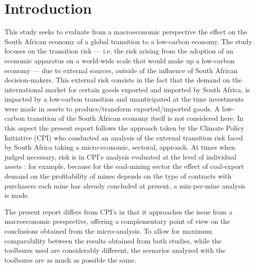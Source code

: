 \documentclass[12pt,english]{article}
\begin{document}
\tableofcontents

\section{Introduction}



This study seeks to evaluate from a macroeconomic perspective the effect on the South African economy of a global transition to a low-carbon economy. The study focuses on the transition risk --- i.e. the risk arising from the adoption of an economic apparatus on a world-wide scale that would make up a low-carbon economy --- due to external sources, outside of the influence of South African decision-makers. This external risk consists in the fact that the demand on the international market for certain goods exported and imported by South Africa, %
is impacted by a low-carbon transition and unanticipated at the time investments were made in assets to produce/transform exported/imported goods. 
A low-carbon transition of the South African economy itself is not considered here. In this aspect the present report follows the approach taken by the Climate Policy Initiative (CPI) who conducted an analysis of the external transition risk faced by South Africa taking a micro-economic, sectoral, approach. At times when judged necessary, risk is in CPI's analysis evaluated at the level of individual assets : for example, because for the coal-mining sector the effect of coal-export demand on the profitability of mines depends on the type of contracts with purchasers each mine has already concluded at present, a min-per-mine analysis is made. 

The present report differs from CPI's in that it approaches the issue from a macroeconomic perspective, %
offering a complementary point of view on the conclusions obtained from the micro-analysis. To allow for maximum comparability between the results obtained from both studies, while the toolboxes used are considerably different, the scenarios analyzed with the toolboxes are as much as possible the same. 
\end{document}
